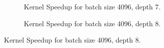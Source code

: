 \begin{figure}[ht]
\begin{subfigure}[b]{.3\textwidth}
    \caption{Kernel Speedup for batch size 4096, depth 7.}
  \end{subfigure}
  \hfill
  \begin{subfigure}[b]{.3\textwidth}
    \caption{Kernel Speedup for batch size 4096, depth 8.}
  \end{subfigure}
\end{figure}